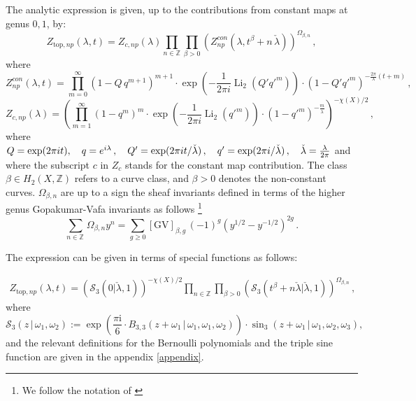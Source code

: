 \documentclass[a4paper,12pt,justification=centering]{article}
\numberwithin{equation}{section}
\newcommand{\ii}{\textnormal{i}}
\newcommand{\I}{{\mathrm i}}
\theoremstyle{plain}%
\theoremstyle{definition}
\begin{document}
The analytic expression is given, up to the contributions from constant maps at genus $0,1$, by:
\begin{equation}
Z_{\textrm{top},np}(\lambda,t) =  Z_{c,np}(\lambda)  \prod_{n\in\mathbb{Z}} \prod_{\beta>0} \left( Z^{con}_{np} (\lambda, t^{\beta}+ n \, \check{\lambda})\right)^{\Omega_{\beta,n}}\,,
\end{equation}
where
$$Z^{con}_{np}(\lambda,t)= \prod_{m=0}^{\infty} (1-Q\, q^{m+1})^{m+1}  \cdot \exp\left(-\frac{1}{2\pi i} \operatorname{Li}_2(Q' q'^m)\right) \cdot (1-Q' q'^m)^{-\frac{2\pi}{\lambda}\left( t+m\right)}\,, $$
$$
Z_{c,np}(\lambda)= \left( \prod_{m=1}^{\infty} (1- q^{m})^{m}  \cdot \exp\left(-\frac{1}{2\pi i} \operatorname{Li}_2(q'^m)\right) \cdot (1-q'^m)^{-\frac{ m}{\check{\lambda}}}\right)^{-\chi(X)/2}\,,
$$
where $Q=\exp(2\pi i t),\quad q=e^{\ii\lambda}\,, \quad Q'=\exp(2\pi i t/\check{\lambda})\,, \quad q'=\exp(2\pi i/\check{\lambda})\,,\quad \check{\lambda}=\frac{\lambda}{2\pi}$ and where the subscript $c$ in $Z_c$ stands for the constant map contribution. The class $\beta \in H_{2}(X,\mathbb{Z})$ refers to a curve class, and $\beta>0$ denotes the non-constant curves. $\Omega_{\beta,n}$ are up to a sign the sheaf invariants defined in terms of the higher genus Gopakumar-Vafa invariants as follows \cite{MaulikToda} \footnote{We follow the notation of \cite{Stoppa}}
\begin{equation}
\sum_{n\in \mathbb{Z}\,} \Omega_{\beta,n} y^n = \sum_{g\ge0} [\textrm{GV}]_{\beta,g}\, (-1)^g (y^{1/2}-y^{-1/2})^{2g}\,.
\end{equation}

The expression can be given in terms of special functions as follows:

\begin{equation}
\begin{split}
Z_{\textrm{top},np}(\lambda,t) =\left( \mathcal{S}_3(0 | \check{\lambda},1)\right)^{-\chi(X)/2}  \prod_{n\in\mathbb{Z}} \prod_{\beta>0} \left( \mathcal{S}_3(t^{\beta} + n \check{\lambda} | \check{\lambda},1)\right)^{\Omega_{\beta,n}}\,,
\end{split}
\end{equation}
where 
$$ 
    \mathcal{S}_3(z\, | \, \omega_1,\omega_2) := \exp\left(\frac{\pi \I}{6} \cdot B_{3,3}(z+\omega_1\,|\,\omega_1,\omega_1,\omega_2)\right) \cdot \sin_3(z+\omega_1\, |\, \omega_1,\omega_2,\omega_3),$$
and the relevant definitions for the Bernoulli polynomials and the triple sine function are given in the appendix \ref{appendix}. 
\end{document}
